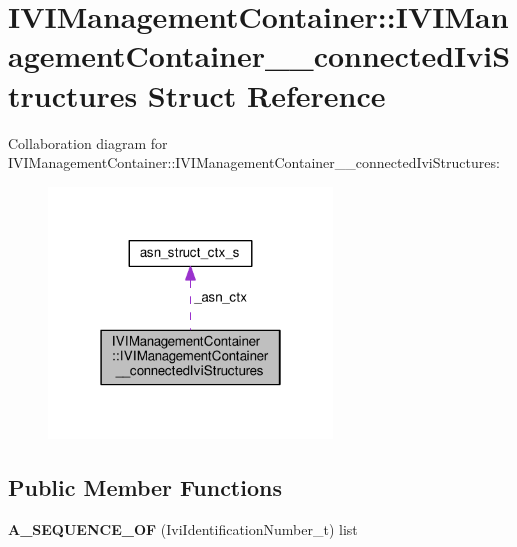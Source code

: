 \hypertarget{structIVIManagementContainer_1_1IVIManagementContainer____connectedIviStructures}{}\section{I\+V\+I\+Management\+Container\+:\+:I\+V\+I\+Management\+Container\+\_\+\+\_\+connected\+Ivi\+Structures Struct Reference}
\label{structIVIManagementContainer_1_1IVIManagementContainer____connectedIviStructures}


Collaboration diagram for I\+V\+I\+Management\+Container\+:\+:I\+V\+I\+Management\+Container\+\_\+\+\_\+connected\+Ivi\+Structures\+:\nopagebreak
\begin{figure}[H]
\begin{center}
\leavevmode
\includegraphics[width=214pt]{structIVIManagementContainer_1_1IVIManagementContainer____connectedIviStructures__coll__graph}
\end{center}
\end{figure}
\subsection*{Public Member Functions}
\begin{DoxyCompactItemize}
\item 
{\bfseries A\+\_\+\+S\+E\+Q\+U\+E\+N\+C\+E\+\_\+\+OF} (Ivi\+Identification\+Number\+\_\+t) list\hypertarget{structIVIManagementContainer_1_1IVIManagementContainer____connectedIviStructures_a4b9a982843dabbc9fd1f66c5b0c15c49}{}\label{structIVIManagementContainer_1_1IVIManagementContainer____connectedIviStructures_a4b9a982843dabbc9fd1f66c5b0c15c49}

\end{DoxyCompactItemize}
